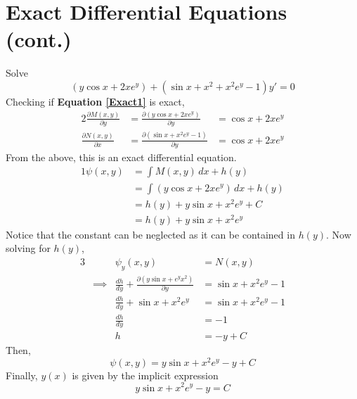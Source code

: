 \documentclass[twoside]{report}
\begin{document}
    \section{Exact Differential Equations (cont.)}
    \begin{example}
        Solve
        \begin{equation}
            \label{Exact1}
            (y\cos x + 2xe^{y}) + (\sin x + x^{2} + x^{2}e^{y} - 1)y' = 0
        \end{equation}
        Checking if \textbf{Equation \ref{Exact1}} is exact,
        \begin{alignat}{2}
            \frac{\partial M(x, y)}{\partial y} &= \frac{\partial (y\cos x + 2xe^y)}{\partial y} &= \cos x + 2xe^y\\
            \frac{\partial N(x, y)}{\partial x} &= \frac{\partial (\sin x + x^{2}e^{y} - 1)}{\partial y} &= \cos x + 2xe^y
        \end{alignat}
        From the above, this is an exact differential equation.
        \begin{alignat}{1}
            \psi(x, y) &= \int M(x, y)\,dx + h(y)\\
            &= \int (y\cos x + 2xe^{y})\,dx + h(y)\\
            &= h(y) + y\sin x+ x^{2}e^{y} + C\\
            &= h(y) + y\sin x + x^{2}e^{y}
         \end{alignat}
         Notice that the constant can be neglected as it can be contained in $h(y)$. Now solving for $h(y)$,
         \begin{alignat}{3}
            &&\psi_{y}(x, y) &= N(x, y)\\
            &\implies&\frac{dh}{dy} + \frac{\partial(y\sin x + e^{y}x^{2})}{\partial y}&=\sin x + x^{2}e^{y} - 1\\
            &&\frac{dh}{dy} + \sin x + x^{2}e^{y}&=\sin x + x^{2}e^{y} - 1\\
            &&\frac{dh}{dy}&= -1\\
            &&h&=-y + C
         \end{alignat}
         Then,
         \begin{equation}
             \psi(x, y) = y\sin x + x^{2}e^{y} - y + C
         \end{equation}
         Finally, $y(x)$ is given by the implicit expression
         \begin{equation}
             y\sin x + x^{2}e^{y} - y = C
         \end{equation}
    \end{example}
\end{document}
